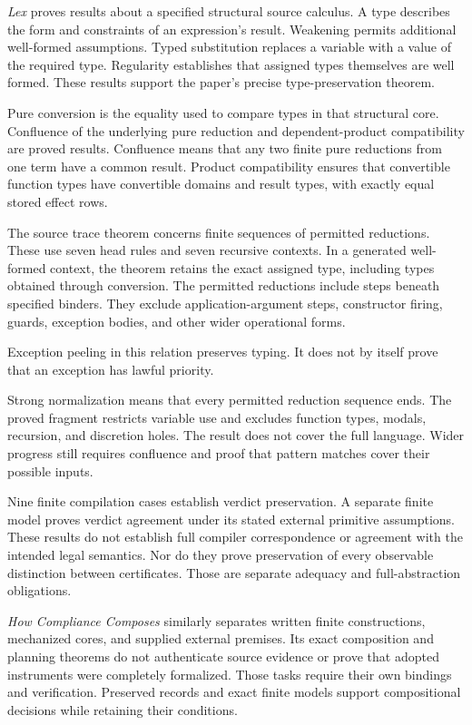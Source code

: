 \documentclass{momentum}
\begin{document}
\emph{Lex} proves results about a specified structural source calculus. A type describes the form and constraints of an expression's result. Weakening permits additional well-formed assumptions. Typed substitution replaces a variable with a value of the required type. Regularity establishes that assigned types themselves are well formed. These results support the paper's precise type-preservation theorem. \cite[Section~4.2]{lex}

Pure conversion is the equality used to compare types in that structural core. Confluence of the underlying pure reduction and dependent-product compatibility are proved results. Confluence means that any two finite pure reductions from one term have a common result. Product compatibility ensures that convertible function types have convertible domains and result types, with exactly equal stored effect rows.

The source trace theorem concerns finite sequences of permitted reductions. These use seven head rules and seven recursive contexts. In a generated well-formed context, the theorem retains the exact assigned type, including types obtained through conversion. The permitted reductions include steps beneath specified binders. They exclude application-argument steps, constructor firing, guards, exception bodies, and other wider operational forms.

Exception peeling in this relation preserves typing. It does not by itself prove that an exception has lawful priority. \cite[Section~4.2, Source trace preservation]{lex}

Strong normalization means that every permitted reduction sequence ends. The proved fragment restricts variable use and excludes function types, modals, recursion, and discretion holes. The result does not cover the full language. Wider progress still requires confluence and proof that pattern matches cover their possible inputs.

Nine finite compilation cases establish verdict preservation. A separate finite model proves verdict agreement under its stated external primitive assumptions. These results do not establish full compiler correspondence or agreement with the intended legal semantics. Nor do they prove preservation of every observable distinction between certificates. Those are separate adequacy and full-abstraction obligations. \cite[Sections~5--5.1 and~11--12]{lex}

\emph{How Compliance Composes} similarly separates written finite constructions, mechanized cores, and supplied external premises. Its exact composition and planning theorems do not authenticate source evidence or prove that adopted instruments were completely formalized. Those tasks require their own bindings and verification. Preserved records and exact finite models support compositional decisions while retaining their conditions. \cite[Sections~10--11]{composes}
\end{document}
